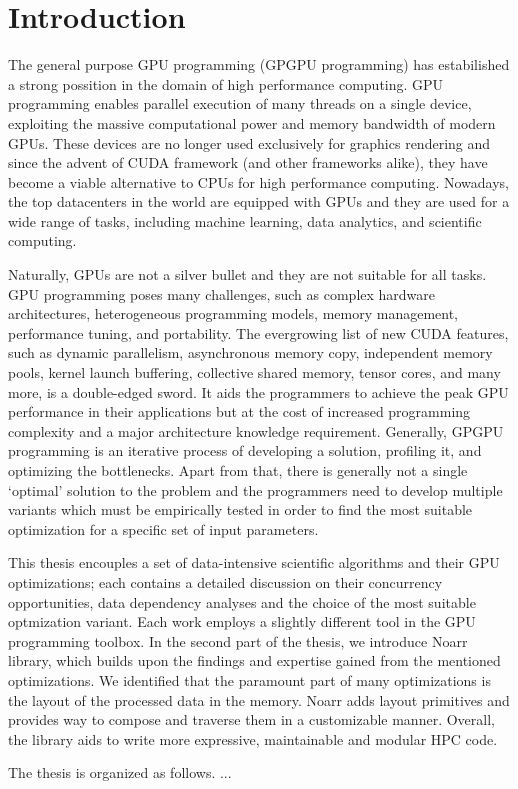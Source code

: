 \chapter{Introduction}

The general purpose GPU programming (GPGPU programming) has estabilished a strong possition in the domain of high performance computing. 
GPU programming enables parallel execution of many threads on a single device, exploiting the massive computational power and memory bandwidth of modern GPUs. 
These devices are no longer used exclusively for graphics rendering and since the advent of CUDA framework (and other frameworks alike), they have become a viable alternative to CPUs for high performance computing.
Nowadays, the top datacenters in the world are equipped with GPUs and they are used for a wide range of tasks, including machine learning, data analytics, and scientific computing.

Naturally, GPUs are not a silver bullet and they are not suitable for all tasks. 
GPU programming poses many challenges, such as complex hardware architectures, heterogeneous programming models, memory management, performance tuning, and portability.
The evergrowing list of new CUDA features, such as dynamic parallelism, asynchronous memory copy, independent memory pools, kernel launch buffering, collective shared memory, tensor cores, and many more, is a double-edged sword. 
It aids the programmers to achieve the peak GPU performance in their applications but at the cost of increased programming complexity and a major architecture knowledge requirement.
Generally, GPGPU programming is an iterative process of developing a solution, profiling it, and optimizing the bottlenecks.
Apart from that, there is generally not a single `optimal' solution to the problem and the programmers need to develop multiple variants which must be empirically tested in order to find the most suitable optimization for a specific set of input parameters.

This thesis encouples a set of data-intensive scientific algorithms and their GPU optimizations; each contains a detailed discussion on their concurrency opportunities, data dependency analyses and the choice of the most suitable optmization variant. Each work employs a slightly different tool in the GPU programming toolbox. In the second part of the thesis, we introduce Noarr library, which builds upon the findings and expertise gained from the mentioned optimizations. We identified that the paramount part of many optimizations is the layout of the processed data in the memory. Noarr adds layout primitives and provides way to compose and traverse them in a customizable manner. Overall, the library aids to write more expressive, maintainable and modular HPC code.


The thesis is organized as follows. ...
